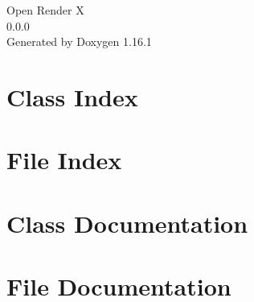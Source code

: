 \documentclass[twoside]{book}
\newcommand{\+}{\discretionary{\mbox{\scriptsize$\hookleftarrow$}}{}{}}
\newcommand{\clearemptydoublepage}{%
    \newpage{\pagestyle{empty}\cleardoublepage}%
  }
\begin{document}
  \raggedbottom
    \hypersetup{pageanchor=false,
                bookmarksnumbered=true,
                pdfencoding=unicode
               }
  \begin{titlepage}
  \vspace*{7cm}
  \begin{center}%
  {\Large Open Render X}\\
  [1ex]\large 0.\+0.\+0 \\
  \vspace*{1cm}
  {\large Generated by Doxygen 1.16.1}\\
  \end{center}
  \end{titlepage}
  \clearemptydoublepage
  \tableofcontents
  \clearemptydoublepage
  \hypersetup{pageanchor=true}

\chapter{Class Index}

\chapter{File Index}

\chapter{Class Documentation}








\chapter{File Documentation}















  \backmatter
  \newpage
  \clearemptydoublepage
  \printindex
\end{document}
